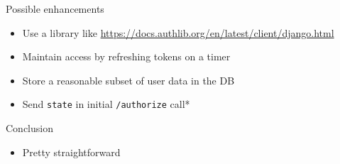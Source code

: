 \documentclass[xcolor=svgnames,17pt]{beamer}
\begin{document}
\begin{frame}
\tableofcontents[currentsection]
\end{frame}

\begin{frame}{Possible enhancements}
\begin{itemize}
\item Use a library like
\url{https://docs.authlib.org/en/latest/client/django.html}
\item Maintain access by refreshing tokens on a timer
\item Store a reasonable subset of user data in the DB
\item Send \texttt{state} in initial \texttt{/authorize} call*
\end{itemize}
\end{frame}

\begin{frame}{Conclusion}
\begin{itemize}
\item Pretty straightforward
\end{itemize}
\end{frame}
\end{document}

